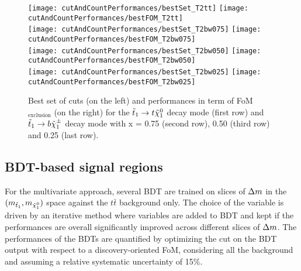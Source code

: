             \begin{figure}[h!]
                \centering
                \texttt{[image: cutAndCountPerformances/bestSet\_T2tt]}
                \texttt{[image: cutAndCountPerformances/bestFOM\_T2tt]}\\
                \texttt{[image: cutAndCountPerformances/bestSet\_T2bw075]}
                \texttt{[image: cutAndCountPerformances/bestFOM\_T2bw075]}\\
                \texttt{[image: cutAndCountPerformances/bestSet\_T2bw050]}
                \texttt{[image: cutAndCountPerformances/bestFOM\_T2bw050]}\\
                \texttt{[image: cutAndCountPerformances/bestSet\_T2bw025]}
                \texttt{[image: cutAndCountPerformances/bestFOM\_T2bw025]}
                \caption{Best set of cuts (on the left) and performances in term of 
                FoM$_\text{exclusion}$ (on the right) for the $\tilde{t}_1 \rightarrow t 
                \tilde{\chi}_1^0$ decay mode (first row) and $\tilde{t}_1 \rightarrow b \tilde{\chi}_1^\pm$ 
                decay mode with x = 0.75 (second row), 0.50 (third row) and 0.25 (last row). 
                }                                                     
                \label{fig:cutAndCountPerformances}
            \end{figure}

        \subsection{BDT-based signal regions}
        
            For the multivariate approach, several BDT are trained on slices of $\Delta m$ in the $(m_{\tilde{t}_1},m_{\tilde{\chi}_1^0})$
            space against the $t\bar{t}$ background only. The choice of the variable is driven by an iterative method where variables 
            are added to BDT and kept if the performances are overall significantly improved across different slices of $\Delta m$. The 
            performances of the BDTs are quantified by optimizing the cut on the BDT output with respect to a discovery-oriented 
            FoM, considering all the background and assuming a relative systematic uncertainty of 15\%.

